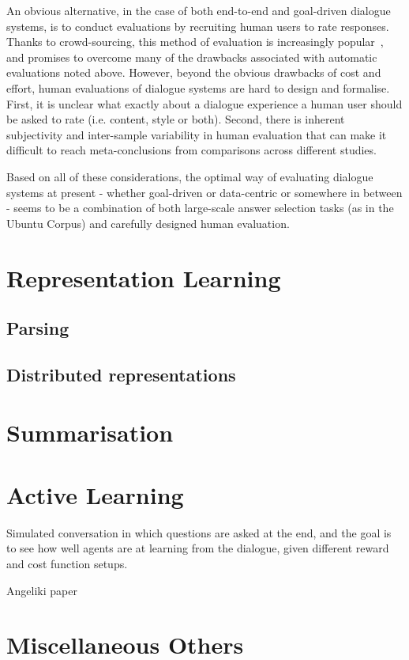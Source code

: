 \documentclass[11pt,letterpaper]{article}
\begin{document}
An obvious alternative, in the case of both end-to-end and goal-driven dialogue systems, is to conduct evaluations by recruiting human users to rate responses. Thanks to crowd-sourcing, this method of evaluation is increasingly popular~\cite{serban2016hierarchical,wen2016network}, and promises to overcome many of the drawbacks associated with automatic evaluations noted above. However, beyond the obvious drawbacks of cost and effort, human evaluations of dialogue systems are hard to design and formalise. First, it is unclear what exactly about a dialogue experience a human user should be asked to rate (i.e. content, style or both). Second, there is inherent subjectivity and inter-sample variability in human evaluation that can make it difficult to reach meta-conclusions from comparisons across different studies. 

Based on all of these considerations, the optimal way of evaluating dialogue systems at present - whether goal-driven or data-centric or somewhere in between - seems to be a  combination of both large-scale answer selection tasks (as in the Ubuntu Corpus) and carefully designed human evaluation.  


\section{Representation Learning}
\subsection{Parsing}
\subsection{Distributed representations}

\section{Summarisation}

\section{Active Learning}

\cite{weston2016dialog} Simulated conversation in which questions are asked at the end, and the goal is to see how well agents are at learning from the dialogue, given different reward and cost function setups. 

Angeliki paper

\cite{li2016deep} %

\section{Miscellaneous Others}












\end{document}
